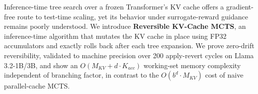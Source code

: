 


Inference-time tree search over a frozen Transformer's KV cache offers a gradient-free route to test-time scaling, yet its behavior under surrogate-reward guidance remains poorly understood. We introduce \textbf{Reversible KV-Cache MCTS}, an inference-time algorithm that mutates the KV cache in place using FP32 accumulators and exactly rolls back after each tree expansion. We prove zero-drift reversibility, validated to machine precision over 200 apply-revert cycles on Llama 3.2-1B/3B, and show an $O(M_{KV}+d\cdot K_{acc})$ working-set memory complexity independent of branching factor, in contrast to the $O(b^d\cdot M_{KV})$ cost of naive parallel-cache MCTS.

